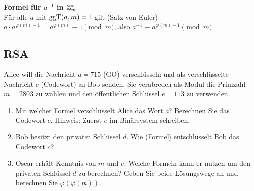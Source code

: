 \textbf{Formel für $a^{-1}$ in $\mathbb{Z}_{m}^*$}\\
Für alle $a$ mit $\operatorname{ggT}(a, m) = 1$ gilt (Satz von Euler) $a \cdot a^{\varphi(m)-1} = a^{\varphi(m)} \equiv 1 \pmod m$, also $a^{-1} \equiv a^{\varphi(m)-1} \pmod m$

\subsection{RSA}

\begin{aufgabe}[Aufgabe 9]
Alice will die Nachricht $a = 715$ (GO) verschlüsseln und als verschlüsselte Nachricht $c$ (Codewort) an Bob senden. Sie verabreden als Modul die Primzahl $m = 2803$ zu wählen und den öffentlichen Schlüssel $e = 113$ zu verwenden.
\begin{enumerate}[label=\alph*)]
  \item Mit welcher Formel verschlüsselt Alice das Wort $a$? Berechnen Sie das Codewort $c$. Hinweis: Zuerst $e$ im Binärsystem schreiben.
  \item Bob besitzt den privaten Schlüssel $d$. Wie (Formel) entschlüsselt Bob das Codewort $c$?
  \item Oscar erhält Kenntnis von $m$ und $e$. Welche Formeln kann er nutzen um den privaten Schlüssel $d$ zu berechnen? Geben Sie beide Lösungswege an und berechnen Sie $\varphi(\varphi(m))$.
\end{enumerate}
\end{aufgabe}

